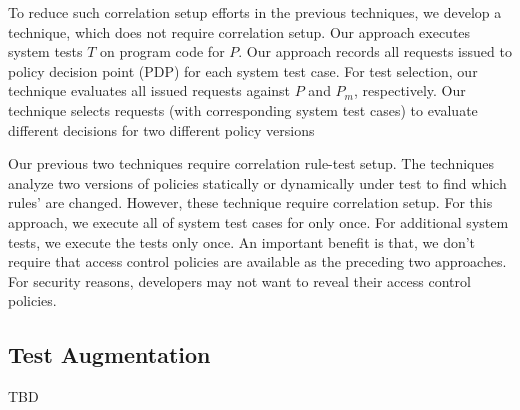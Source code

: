 To reduce such correlation setup efforts in the previous techniques, we develop
a technique, which does not require correlation setup. 
Our approach executes system tests $T$ on program code for $P$. Our approach records all requests issued to policy decision point (PDP) for each system test case. For test selection, our technique evaluates all issued requests against $P$ and $P_m$, respectively.
Our technique selects requests (with corresponding system test cases) to evaluate different decisions for two different policy versions 

Our previous two techniques require correlation rule-test setup. The techniques analyze two versions of policies statically or dynamically 
under test to find which rules' are changed. However, these technique require correlation setup.
For this approach, we execute all of system test cases for only once. For additional system tests, we
execute the tests only once. An important benefit is that, we don't require that access control policies are available as the preceding two
approaches. For security reasons, developers may not want to reveal their access control policies.



\subsection{Test Augmentation}
TBD








